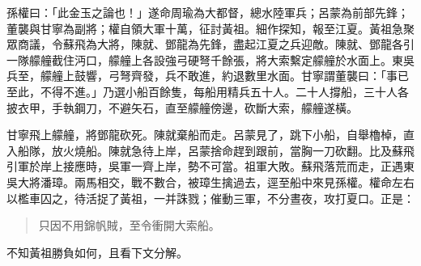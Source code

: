 孫權曰：「此金玉之論也！」遂命周瑜為大都督，總水陸軍兵；呂蒙為前部先鋒；董襲與甘寧為副將；權自領大軍十萬，征討黃祖。細作探知，報至江夏。黃祖急聚眾商議，令蘇飛為大將，陳就、鄧龍為先鋒，盡起江夏之兵迎敵。陳就、鄧龍各引一隊艨艟截住沔口，艨艟上各設強弓硬弩千餘張，將大索繫定艨艟於水面上。東吳兵至，艨艟上鼓響，弓弩齊發，兵不敢進，約退數里水面。甘寧謂董襲曰：「事已至此，不得不進。」乃選小船百餘隻，每船用精兵五十人。二十人撐船，三十人各披衣甲，手執鋼刀，不避矢石，直至艨艟傍邊，砍斷大索，艨艟遂橫。

甘寧飛上艨艟，將鄧龍砍死。陳就棄船而走。呂蒙見了，跳下小船，自舉櫓棹，直入船隊，放火燒船。陳就急待上岸，呂蒙捨命趕到跟前，當胸一刀砍翻。比及蘇飛引軍於岸上接應時，吳軍一齊上岸，勢不可當。祖軍大敗。蘇飛落荒而走，正遇東吳大將潘璋。兩馬相交，戰不數合，被璋生擒過去，逕至船中來見孫權。權命左右以檻車囚之，待活捉了黃祖，一并誅戮；催動三軍，不分晝夜，攻打夏口。正是：

\begin{quote}
只因不用錦帆賊，至令衝開大索船。
\end{quote}

不知黃祖勝負如何，且看下文分解。
